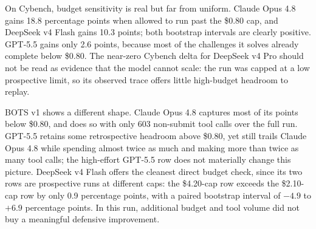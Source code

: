 \documentclass{jmlr}%
\begin{document}
\begin{table}[t]
\centering
\caption{Retrospective budget headroom above \$0.80 per sample. Deltas are full-trace score minus the same trace capped at \$0.80; bracketed values are 95\% paired bootstrap intervals over task IDs, in percentage points.}
\label{tab:scaling-headroom}
\end{table}

On Cybench, budget sensitivity is real but far from uniform.
Claude Opus 4.8 gains 18.8 percentage points when allowed to run past the \$0.80 cap, and DeepSeek v4 Flash gains 10.3 points; both bootstrap intervals are clearly positive.
GPT-5.5 gains only 2.6 points, because most of the challenges it solves already complete below \$0.80.
The near-zero Cybench delta for DeepSeek v4 Pro should not be read as evidence that the model cannot scale: the run was capped at a low prospective limit, so its observed trace offers little high-budget headroom to replay.

BOTS v1 shows a different shape.
Claude Opus 4.8 captures most of its points below \$0.80, and does so with only 603 non-submit tool calls over the full run.
GPT-5.5 retains some retrospective headroom above \$0.80, yet still trails Claude Opus 4.8 while spending almost twice as much and making more than twice as many tool calls; the high-effort GPT-5.5 row does not materially change this picture.
DeepSeek v4 Flash offers the cleanest direct budget check, since its two rows are prospective runs at different caps: the \$4.20-cap row exceeds the \$2.10-cap row by only 0.9 percentage points, with a paired bootstrap interval of $-4.9$ to $+6.9$ percentage points.
In this run, additional budget and tool volume did not buy a meaningful defensive improvement.
\end{document}
